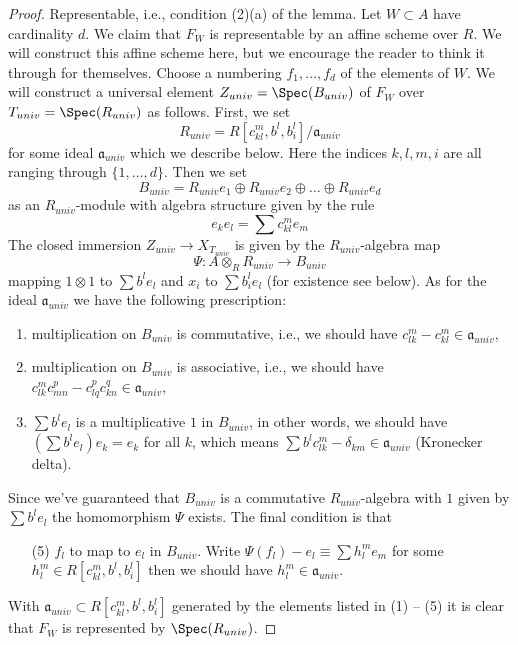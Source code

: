\begin{proof}
\medskip\noindent
Representable, i.e., condition (2)(a) of the lemma. Let $W \subset A$
have cardinality $d$. We claim that $F_W$ is representable by an affine
scheme over $R$. We will construct this affine scheme here, but we encourage
the reader to think it through for themselves. Choose a numbering
$f_1, \ldots, f_d$ of the elements of $W$. We will construct a universal
element $Z_{univ} = \Spec(B_{univ})$ of $F_W$ over $T_{univ} = \Spec(R_{univ})$
as follows. First, we set
$$
R_{univ} = R[c_{kl}^m, b^l, b_i^l]/\mathfrak a_{univ}
$$
for some ideal $\mathfrak a_{univ}$ which we describe below.
Here the indices $k, l, m, i$ are all ranging through $\{1, \ldots, d\}$.
Then we set
$$
B_{univ} = R_{univ}e_1 \oplus R_{univ}e_2 \oplus \ldots \oplus R_{univ}e_d
$$
as an $R_{univ}$-module with algebra structure given by the rule
$$
e_ke_l = \sum c_{kl}^m e_m
$$
The closed immersion $Z_{univ} \to X_{T_{univ}}$ is given
by the $R_{univ}$-algebra map
$$
\Psi : A \otimes_R R_{univ} \longrightarrow B_{univ}
$$
mapping $1 \otimes 1$ to $\sum b^le_l$ and $x_i$ to $\sum b_i^le_l$
(for existence see below). As for the ideal $\mathfrak a_{univ}$
we have the following prescription:
\begin{enumerate}
\item multiplication on $B_{univ}$ is commutative, i.e.,
we should have $c_{lk}^m - c_{kl}^m \in \mathfrak a_{univ}$,
\item multiplication on $B_{univ}$ is associative, i.e.,
we should have $c_{lk}^m c_{m n}^p - c_{lq}^p c_{kn}^q \in \mathfrak a_{univ}$,
\item $\sum b^le_l$ is a multiplicative $1$ in $B_{univ}$,
in other words, we should have $(\sum b^le_l)e_k = e_k$ for all $k$,
which means $\sum b^lc_{lk}^m - \delta_{km} \in \mathfrak a_{univ}$
(Kronecker delta).
\end{enumerate}
Since we've guaranteed that $B_{univ}$ is a commutative
$R_{univ}$-algebra with $1$ given by $\sum b^le_l$ the homomorphism $\Psi$
exists. The final condition is that
\begin{enumerate}
\item[(5)] $f_l$ to map to $e_l$ in $B_{univ}$. Write
$\Psi(f_l) - e_l \equiv \sum h_l^me_m$ for some
$h_l^m \in R[c_{kl}^m, b^l, b_i^l]$
then we should have $h_l^m \in \mathfrak a_{univ}$.
\end{enumerate}
With $\mathfrak a_{univ} \subset R[c_{kl}^m, b^l, b_i^l]$ generated
by the elements listed in (1) -- (5)
it is clear that $F_W$ is represented by $\Spec(R_{univ})$.
\end{proof}


